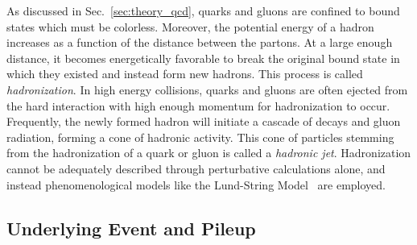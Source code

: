 As discussed in Sec.~\ref{sec:theory_qcd}, quarks and gluons are confined to bound states which must be colorless.
Moreover, the potential energy of a hadron increases as a function of the distance between the partons.
At a large enough distance, it becomes energetically favorable to break the original bound state in which they existed and instead form new hadrons.
This process is called \emph{hadronization}.
In high energy collisions, quarks and gluons are often ejected from the hard interaction with high enough momentum for hadronization to occur. 
Frequently, the newly formed hadron will initiate a cascade of decays and gluon radiation, forming a cone of hadronic activity.
This cone of particles stemming from the hadronization of a quark or gluon is called a \emph{hadronic jet}.
Hadronization cannot be adequately described through perturbative calculations alone, and instead phenomenological models like the Lund-String Model~\cite{Andersson:1983ia} are employed.

\subsection{Underlying Event and Pileup}
